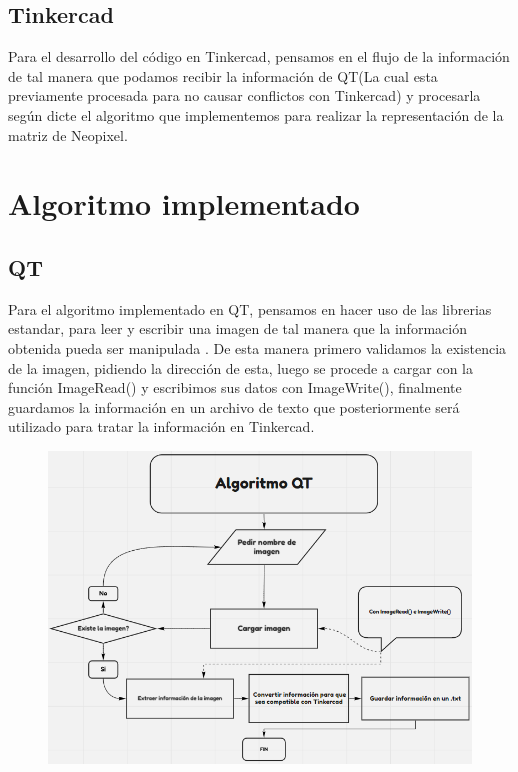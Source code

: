 \documentclass{article}
\begin{document}
    
    \subsection{Tinkercad}
    \begin{flushleft}
        Para el desarrollo del código en Tinkercad, pensamos en el flujo de la información de tal manera que podamos recibir la información de QT(La cual esta previamente procesada para no causar conflictos con Tinkercad) y procesarla según dicte el algoritmo que implementemos para realizar la representación de la matriz de Neopixel. 
    \end{flushleft}
        
\newpage
    
\section{Algoritmo implementado}
\label{implementado}
    \begin{flushleft}
        
    \subsection{QT}
    Para el algoritmo implementado en QT,  pensamos en hacer uso de las librerias estandar, para leer y escribir una imagen de tal manera que la información obtenida pueda ser manipulada . De esta manera primero validamos la existencia de la imagen, pidiendo la dirección de esta, luego se procede a cargar con la función ImageRead() y escribimos sus datos con ImageWrite(), finalmente guardamos la información en un  archivo de texto que posteriormente será utilizado para tratar la información en Tinkercad.  
    \end{flushleft}
    
    \vspace{0.5cm}
            
    \begin{figure}[h]
    \includegraphics[width=12cm]{Imagenes/diagrama_qt.png}
    \centering
    \label{fig:ram}
    \end{figure}
    \vspace{0.5cm}
\end{document}
